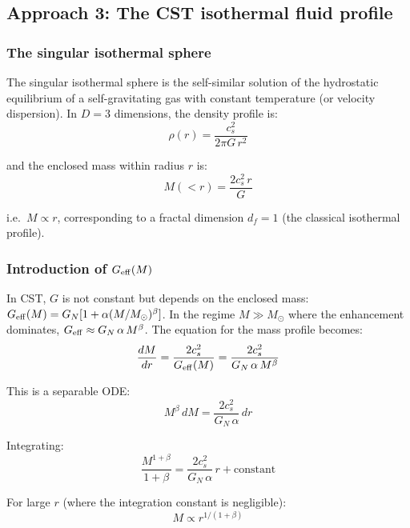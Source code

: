 \documentclass[10pt,a4paper]{article}
\begin{document}
\subsection{Approach 3: The CST isothermal fluid profile}\label{sec:isothermal}

\subsubsection{The singular isothermal sphere}

The singular isothermal sphere is the self-similar solution of the hydrostatic equilibrium of a self-gravitating gas with constant temperature (or velocity dispersion). In $D = 3$ dimensions, the density profile is:
\begin{equation}
\rho(r) = \frac{c_s^2}{2\pi G\,r^2}
\end{equation}

and the enclosed mass within radius $r$ is:
\begin{equation}
M(<r) = \frac{2c_s^2\,r}{G}
\end{equation}

i.e.\ $M \propto r$, corresponding to a fractal dimension $d_f = 1$ (the classical isothermal profile).

\subsubsection{Introduction of $G_{\rm eff}(M)$}

In CST, $G$ is not constant but depends on the enclosed mass: $G_{\rm eff}(M) = G_N[1 + \alpha(M/M_\odot)^\beta]$. In the regime $M \gg M_\odot$ where the enhancement dominates, $G_{\rm eff} \approx G_N\,\alpha\,M^\beta$. The equation for the mass profile becomes:
\begin{equation}\label{eq:ode_full}
\frac{dM}{dr} = \frac{2c_s^2}{G_{\rm eff}(M)} = \frac{2c_s^2}{G_N\,\alpha\,M^\beta}
\end{equation}

This is a separable ODE:
\begin{equation}
M^\beta\,dM = \frac{2c_s^2}{G_N\,\alpha}\,dr
\end{equation}

Integrating:
\begin{equation}
\frac{M^{1+\beta}}{1+\beta} = \frac{2c_s^2}{G_N\,\alpha}\,r + \text{constant}
\end{equation}

For large $r$ (where the integration constant is negligible):
\begin{equation}
M \propto r^{1/(1+\beta)}
\end{equation}
\end{document}
